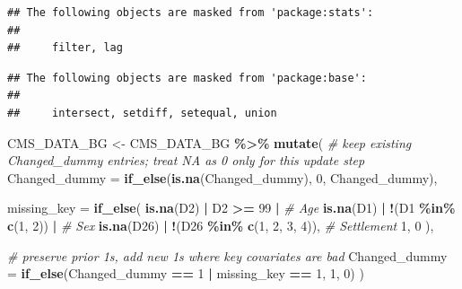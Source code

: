 \documentclass[
]{article}
\newenvironment{Shaded}{\begin{snugshade}}{\end{snugshade}}
\newcommand{\AttributeTok}[1]{\textcolor[rgb]{0.13,0.29,0.53}{#1}}
\newcommand{\CommentTok}[1]{\textcolor[rgb]{0.56,0.35,0.01}{\textit{#1}}}
\newcommand{\DecValTok}[1]{\textcolor[rgb]{0.00,0.00,0.81}{#1}}
\newcommand{\FunctionTok}[1]{\textcolor[rgb]{0.13,0.29,0.53}{\textbf{#1}}}
\newcommand{\NormalTok}[1]{#1}
\newcommand{\OtherTok}[1]{\textcolor[rgb]{0.56,0.35,0.01}{#1}}
\newcommand{\SpecialCharTok}[1]{\textcolor[rgb]{0.81,0.36,0.00}{\textbf{#1}}}
\begin{document}
\begin{verbatim}
## The following objects are masked from 'package:stats':
## 
##     filter, lag
\end{verbatim}

\begin{verbatim}
## The following objects are masked from 'package:base':
## 
##     intersect, setdiff, setequal, union
\end{verbatim}

\begin{Shaded}
\begin{Highlighting}[]
\NormalTok{CMS\_DATA\_BG }\OtherTok{\textless{}{-}}\NormalTok{ CMS\_DATA\_BG }\SpecialCharTok{\%\textgreater{}\%}
  \FunctionTok{mutate}\NormalTok{(}
    \CommentTok{\# keep existing Changed\_dummy entries; treat NA as 0 only for this update step}
    \AttributeTok{Changed\_dummy =} \FunctionTok{if\_else}\NormalTok{(}\FunctionTok{is.na}\NormalTok{(Changed\_dummy), }\DecValTok{0}\NormalTok{, Changed\_dummy),}

    \AttributeTok{missing\_key =} \FunctionTok{if\_else}\NormalTok{(}
      \FunctionTok{is.na}\NormalTok{(D2) }\SpecialCharTok{|}\NormalTok{ D2 }\SpecialCharTok{\textgreater{}=} \DecValTok{99} \SpecialCharTok{|}                  \CommentTok{\# Age}
      \FunctionTok{is.na}\NormalTok{(D1) }\SpecialCharTok{|} \SpecialCharTok{!}\NormalTok{(D1 }\SpecialCharTok{\%in\%} \FunctionTok{c}\NormalTok{(}\DecValTok{1}\NormalTok{, }\DecValTok{2}\NormalTok{)) }\SpecialCharTok{|}        \CommentTok{\# Sex}
      \FunctionTok{is.na}\NormalTok{(D26) }\SpecialCharTok{|} \SpecialCharTok{!}\NormalTok{(D26 }\SpecialCharTok{\%in\%} \FunctionTok{c}\NormalTok{(}\DecValTok{1}\NormalTok{, }\DecValTok{2}\NormalTok{, }\DecValTok{3}\NormalTok{, }\DecValTok{4}\NormalTok{)), }\CommentTok{\# Settlement}
      \DecValTok{1}\NormalTok{, }\DecValTok{0}
\NormalTok{    ),}

    \CommentTok{\# preserve prior 1s, add new 1s where key covariates are bad}
    \AttributeTok{Changed\_dummy =} \FunctionTok{if\_else}\NormalTok{(Changed\_dummy }\SpecialCharTok{==} \DecValTok{1} \SpecialCharTok{|}\NormalTok{ missing\_key }\SpecialCharTok{==} \DecValTok{1}\NormalTok{, }\DecValTok{1}\NormalTok{, }\DecValTok{0}\NormalTok{)}
\NormalTok{  )}


\end{Highlighting}
\end{Shaded}
\end{document}
